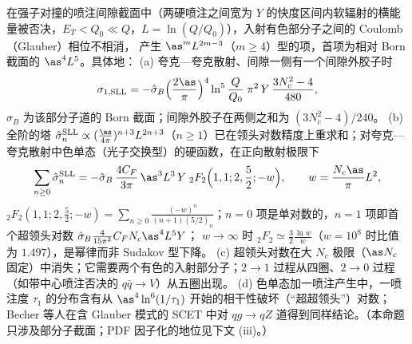 \begin{proposition}\label{prop:jets-sll}
在强子对撞的喷注间隙截面中（两硬喷注之间宽为 $Y$ 的快度区间内软辐射的横能量被否决，$E_T<Q_0\ll Q$，$L=\ln(Q/Q_0)$），入射有色部分子之间的 Coulomb（Glauber）相位不相消，
产生 $\as^mL^{2m-3}$（$m\ge4$）型的项，首项为相对 Born 截面的 $\as^4L^5$\cite[式~(3.22)]{ForshawKyrieleisSeymour2006}。具体地：
(a) 夸克—夸克散射、间隙一侧有一个间隙外胶子时\cite[式~(3.24)]{ForshawKyrieleisSeymour2006}
\begin{equation}\label{eq:jets-sll-fks}
\sigma_{1,\rm SLL}=-\hat\sigma_B\Big(\frac{2\as}{\pi}\Big)^4\ln^5\frac{Q}{Q_0}\;\pi^2\,Y\,\frac{3N_c^2-4}{480},
\end{equation}
$\hat\sigma_B$ 为该部分子道的 Born 截面；间隙外胶子在两侧之和为 $(3N_c^2-4)/240$\cite[式~(2.22)]{Forshaw:2008cq}。
(b) 全阶的塔 $\hat\sigma_n^{\rm SLL}\propto(\frac{\as}{4\pi})^{n+3}L^{2n+3}$（$n\ge1$）已在领头对数精度上重求和\cite{Becher:2021zkk,Becher:2023mtx,Boer:2024hzh,Becher:2024nqc}；对夸克—夸克散射中色单态（光子交换型）的硬函数，在正向散射极限下
\begin{equation}\label{eq:jets-sll-bns}
\sum_{n\ge0}\hat\sigma_n^{\rm SLL}=-\hat\sigma_B\,\frac{4C_F}{3\pi}\,\as^3L^3\,Y\;{}_2F_2\Big(1,1;2,\frac52;-w\Big),\qquad w=\frac{N_c\as}{\pi}L^2,
\end{equation}
${}_2F_2(1,1;2,\frac52;-w)=\sum_{n\ge0}\frac{(-w)^n}{(n+1)(5/2)_n}$；$n=0$ 项是单对数的，$n=1$ 项即首个超领头对数 $\hat\sigma_B\frac{4}{15\pi^2}C_FN_c\as^4L^5Y$；
$w\to\infty$ 时 ${}_2F_2\simeq\frac32\frac{\ln w}{w}$（$w=10^8$ 时比值为 $1.497$），是幂律而非 Sudakov 型下降。
(c) 超领头对数在大 $N_c$ 极限（$\as N_c$ 固定）中消失；它需要两个有色的入射部分子；$2\to1$ 过程从四圈、$2\to0$ 过程（如带中心喷注否决的 $q\bar q\to V$）从五圈出现\cite{Becher:2021zkk}。
(d) 色单态加一喷注产生中，一喷注度 $\tau_1$ 的分布含有从 $\as^4\ln^6(1/\tau_1)$ 开始的相干性破坏（“超超领头”）对数\cite{Banfi:2025mra}；Becher 等人在含 Glauber 模式的 SCET 中对 $qg\to qZ$ 道得到同样结论\cite{Becher:2026kbr}。（本命题只涉及部分子截面；PDF 因子化的地位见下文 (iii)。）
\end{proposition}

